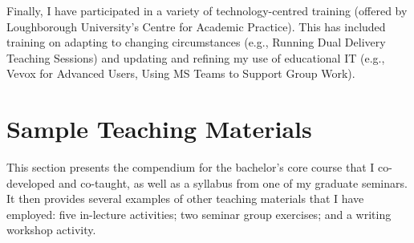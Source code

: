 \documentclass[11pt]{article}
\begin{document}
Finally, I have participated in a variety of technology-centred training (offered by Loughborough University's Centre for Academic Practice). This has included training on adapting to changing circumstances (e.g., Running Dual Delivery Teaching Sessions) and updating and refining my use of educational IT (e.g., Vevox for Advanced Users, Using MS Teams to Support Group Work). 

\section{ Sample Teaching Materials}
\label{sec:materials}

This section presents the compendium for the bachelor's core course that I co-developed and co-taught, as well as a syllabus from one of my graduate seminars. It then provides several examples of other teaching materials that I have employed: five in-lecture activities; two seminar group exercises; and a writing workshop activity.\\










\end{document}
